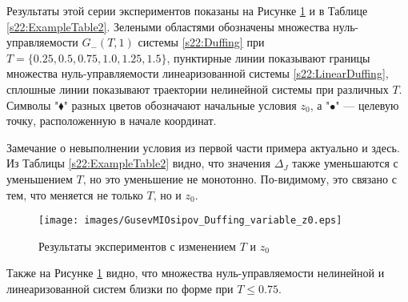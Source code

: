 \documentclass[../main.tex]{subfiles}
\begin{document}
Результаты этой серии экспериментов 
показаны на Рисунке \ref{s22:fig:series2} и в Таблице 
\ref{s22:ExampleTable2}.
Зелеными областями обозначены множества нуль-управляемости $G_{-}(T,1)$ системы 
\eqref{s22:Duffing} при $T = \{0.25, 0.5, 0.75, 1.0, 1.25, 1.5\}$, пунктирные линии показывают границы множества нуль-управляемости линеаризованной системы 
\eqref{s22:LinearDuffing}, сплошные линии показывают траектории нелинейной системы 
при различных $T$. 
Символы "$\blacklozenge$" разных цветов обозначают 
начальные условия $z_0$, а "$\bullet$" --- целевую точку, расположенную в начале координат. 

Замечание о невыполнении условия из первой части примера актуально и здесь. 
Из Таблицы \ref{s22:ExampleTable2} видно, что значения $\Delta_J$ также уменьшаются с уменьшением $T$, но это уменьшение не монотонно. 
По-видимому, это связано с тем, что меняется не только $T$, но и $z_0$.

\begin{figure}
 \centering
 \texttt{[image: images/GusevMIOsipov\_Duffing\_variable\_z0.eps]}
 \caption{Результаты экспериментов с изменением $T$ и $z_0$}
 \label{s22:fig:series2}
\end{figure}

Также на Рисунке \ref{s22:fig:series2} видно, что множества нуль-управляемости нелинейной и линеаризованной систем близки по форме при $ T \leqslant 0.75$.
\end{document}
